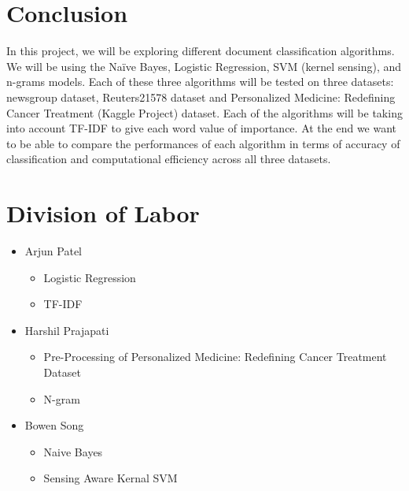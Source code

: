 \documentclass[a4paper, 11pt]{article}
\begin{document}
	\section{Conclusion}
	In this project, we will be exploring different document classification algorithms. We will be using the Naïve Bayes, Logistic Regression, SVM (kernel sensing), and n-grams models. Each of these three algorithms will be tested on three datasets: newsgroup dataset, Reuters21578 dataset and Personalized Medicine: Redefining Cancer Treatment (Kaggle Project) dataset. Each of the algorithms will be taking into account TF-IDF to give each word value of importance. At the end we want to be able to compare the performances of each algorithm in terms of accuracy of classification and computational efficiency across all three datasets. 
	
	\section*{Division of Labor}
	\begin{itemize}
		\item  Arjun Patel
		\begin{itemize}
			\item Logistic Regression
			\item TF-IDF
		\end{itemize}
		\item  Harshil Prajapati
		\begin{itemize}
			\item Pre-Processing of Personalized Medicine: Redefining Cancer Treatment Dataset
			\item N-gram
		\end{itemize}
		\item Bowen Song
		\begin{itemize}
			\item Naive Bayes 
			\item Sensing Aware Kernal SVM
		\end{itemize}
	\end{itemize}
	
	
	\nocite{*}
	{\small
		
		
	}
\end{document}
